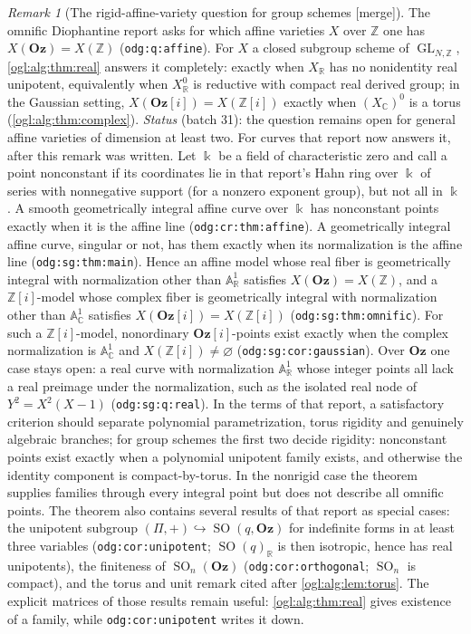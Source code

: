 \documentclass[11pt,oneside]{article}
\numberwithin{equation}{section}
\theoremstyle{definition}
\theoremstyle{remark}
\newtheorem{remark}[remark]{Remark}
\newcommand{\Oz}{\mathbf{Oz}}
\newcommand{\GOz}{\mathbf{Oz}[i]}
\newcommand{\Z}{\mathbb Z}
\newcommand{\R}{\mathbb R}
\newcommand{\C}{\mathbb C}
\newcommand{\GL}{\operatorname{GL}}
\newcommand{\SO}{\operatorname{SO}}
\newcommand{\mergetag}{\textup{\textsf{\small[merge]}}}
\newcommand{\replabel}[1]{\nolinkurl{#1}}
\begin{document}
\begin{remark}[The rigid-affine-variety question for group schemes \mergetag]\label{ogl:alg:rem:affine}
The omnific Diophantine report asks for which affine varieties $X$ over $\Z$
one has $X(\Oz)=X(\Z)$ (\replabel{odg:q:affine}). For $X$ a closed subgroup
scheme of $\GL_{N,\Z}$, \cref{ogl:alg:thm:real} answers it completely: exactly
when $X_\R$ has no nonidentity real unipotent, equivalently when $X_\R^0$ is
reductive with compact real derived group; in the Gaussian setting,
$X(\GOz)=X(\Z[i])$ exactly when $(X_\C)^0$ is a torus
(\cref{ogl:alg:thm:complex}). \emph{Status} (batch 31): the question remains
open for general affine varieties of dimension at least two. For curves that
report now answers it, after this remark was written. Let $\Bbbk$ be a field of
characteristic zero and call a point nonconstant if its coordinates lie in
that report's Hahn ring over $\Bbbk$ of series with nonnegative support (for a
nonzero exponent group), but not all in $\Bbbk$. A smooth geometrically
integral affine curve over $\Bbbk$ has nonconstant points exactly when it is
the affine line (\replabel{odg:cr:thm:affine}). A geometrically integral
affine curve, singular or not, has them exactly when its normalization is the
affine line (\replabel{odg:sg:thm:main}). Hence an affine model whose real
fiber is geometrically integral with normalization other than
$\mathbb A^1_\R$ satisfies $X(\Oz)=X(\Z)$, and a $\Z[i]$-model whose complex
fiber is geometrically integral with normalization other than
$\mathbb A^1_\C$ satisfies $X(\GOz)=X(\Z[i])$
(\replabel{odg:sg:thm:omnific}). For such a $\Z[i]$-model, nonordinary
$\GOz$-points exist exactly when the complex normalization is
$\mathbb A^1_\C$ and $X(\Z[i])\ne\varnothing$
(\replabel{odg:sg:cor:gaussian}). Over $\Oz$ one case stays open: a real
curve with normalization $\mathbb A^1_\R$ whose integer points all lack a
real preimage under the normalization, such as the isolated real node of
$Y^2=X^2(X-1)$ (\replabel{odg:sg:q:real}). In the terms of that report, a
satisfactory criterion
should separate polynomial parametrization, torus rigidity and genuinely
algebraic branches; for group schemes the first two decide rigidity:
nonconstant points exist exactly when a polynomial unipotent family exists, and
otherwise the identity component is compact-by-torus. In the nonrigid case the
theorem supplies families through every integral point but does not describe
all omnific points. The theorem also contains
several results of that report as special cases: the unipotent subgroup
$(\Pi,+)\hookrightarrow\SO(q,\Oz)$ for indefinite forms in at least three
variables (\replabel{odg:cor:unipotent}; $\SO(q)_\R$ is then isotropic, hence
has real unipotents), the finiteness of $\SO_n(\Oz)$
(\replabel{odg:cor:orthogonal}; $\SO_n$ is compact), and the torus and unit
remark cited after \cref{ogl:alg:lem:torus}. The explicit matrices of those
results remain useful: \cref{ogl:alg:thm:real} gives existence of a family,
while \replabel{odg:cor:unipotent} writes it down.
\end{remark}
\end{document}
